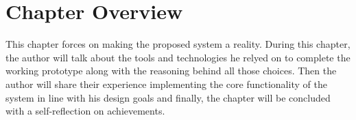 \section{Chapter Overview}

This chapter forces on making the proposed system a reality. During this chapter, the author will talk about the tools and technologies he relyed on to complete the working prototype along with the reasoning behind all those choices. Then the author will share their experience implementing the core functionality of the system in line with his design goals and finally, the chapter will be concluded with a self-reflection on achievements.